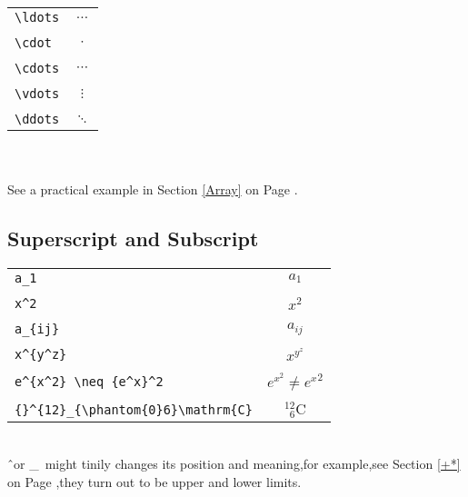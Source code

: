 \documentclass[a4paper]{report}
\begin{document}
\begin{tabular}{l @{\quad} c}

\verb|\ldots| & $\ldots$\\\\

\verb|\cdot| & $\cdot$\\\\

\verb|\cdots| & $\cdots$\\\\

\verb|\vdots| & $\vdots$\\\\

\verb|\ddots| & $\ddots$

\end{tabular}\\\\

See a practical example in Section \ref{Array} on Page
\pageref{Array}.

\subsection{Superscript and Subscript}\label{Sup and Sub}
\begin{tabular}{l @{\quad} c}

\verb|a_1| & $a_1$\\\\

\verb|x^2| & $x^2$\\\\

\verb|a_{ij}| & $a_{ij}$\\\\

\verb|x^{y^z}| & $x^{y^z}$\\\\

\verb|e^{x^2} \neq {e^x}^2| & $e^{x^2} \neq {e^x}^2$\\\\

\verb|{}^{12}_{\phantom{0}6}\mathrm{C}| &
${}^{12}_{\phantom{0}6}\mathrm{C}$

\end{tabular}
\\

\^\ or \_\ might tinily changes its position and meaning,for
example,see Section \ref{+*} on Page \pageref{+*},they turn out to
be upper and lower limits.
\end{document}
